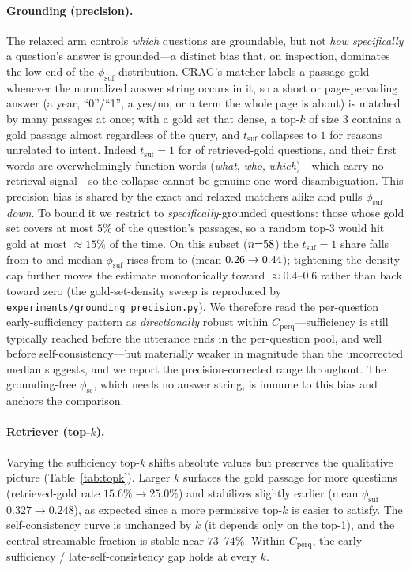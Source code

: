 \paragraph{Grounding (precision).} The relaxed arm controls \emph{which} questions
are groundable, but not \emph{how specifically} a question's answer is grounded---a
distinct bias that, on inspection, dominates the low end of the
$\phi_{\mathrm{suf}}$ distribution. CRAG's matcher labels a passage gold whenever the
normalized answer string occurs in it, so a short or page-pervading answer (a year,
``0''/``1'', a yes/no, or a term the whole page is about) is matched by many passages
at once; with a gold set that dense, a top-$k$ of size $3$ contains a gold passage
almost regardless of the query, and $t_{\mathrm{suf}}$ collapses to $1$ for reasons
unrelated to intent. Indeed $t_{\mathrm{suf}}{=}1$ for \tSufOneAll{} of retrieved-gold
questions, and their first words are overwhelmingly function words (\emph{what},
\emph{who}, \emph{which})---which carry no retrieval signal---so the collapse cannot
be genuine one-word disambiguation. This precision bias is shared by the exact and
relaxed matchers alike and pulls $\phi_{\mathrm{suf}}$ \emph{down}. To bound it we
restrict to \emph{specifically}-grounded questions: those whose gold set covers at
most $5\%$ of the question's passages, so a random top-$3$ would hit gold at most
$\approx15\%$ of the time. On this subset ($n{=}58{}$) the
$t_{\mathrm{suf}}{=}1$ share falls from \tSufOneAll{} to \tSufOneClean{} and median
$\phi_{\mathrm{suf}}$ rises from \phiSufMed{} to \phiSufCleanMed{} (mean
$0.26{}\to0.44{}$); tightening the density cap further moves the
estimate monotonically toward $\approx0.4$--$0.6$ rather than back toward zero (the
gold-set-density sweep is reproduced by
\texttt{experiments/grounding\_precision.py}). We therefore read the per-question early-sufficiency pattern as
\emph{directionally} robust within $C_{\mathrm{perq}}$---sufficiency is still
typically reached before the utterance ends in the per-question pool, and well
before self-consistency---but materially weaker in magnitude than the uncorrected
median \phiSufMed{} suggests, and we report the precision-corrected range
throughout. The grounding-free
$\phi_{\mathrm{sc}}$, which needs no answer string, is immune to this bias and anchors
the comparison.

\paragraph{Retriever (top-$k$).}
Varying the sufficiency top-$k$ shifts absolute values but preserves the
qualitative picture (Table~\ref{tab:topk}). Larger $k$ surfaces the gold passage
for more questions (retrieved-gold rate $15.6\%\to25.0\%$) and stabilizes slightly
earlier (mean $\phi_{\mathrm{suf}}$ $0.327\to0.248$), as expected since a more
permissive top-$k$ is easier to satisfy. The self-consistency curve is unchanged by
$k$ (it depends only on the top-1), and the central streamable fraction is stable
near $73\text{--}74\%$. Within $C_{\mathrm{perq}}$, the early-sufficiency /
late-self-consistency gap holds at every $k$.


